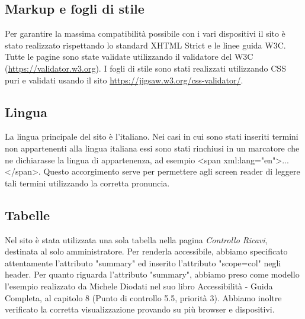 \subsection{Markup e fogli di stile}
Per garantire la massima compatibilità possibile con i vari dispositivi il sito è stato realizzato rispettando lo standard XHTML Strict e le linee guida W3C. Tutte le pagine sono state validate utilizzando il validatore del W3C (\url{https://validator.w3.org}). \newline
I fogli di stile sono stati realizzati utilizzando CSS puri e validati usando il sito \url{https://jigsaw.w3.org/css-validator/}.

\subsection{Lingua}
La lingua principale del sito è l'italiano. Nei casi in cui sono stati inseriti termini non appartenenti alla lingua italiana essi sono stati rinchiusi in un marcatore che ne dichiarasse la lingua di appartenenza, ad esempio <span xml:lang="en">...</span>. Questo accorgimento serve per permettere agli screen reader di leggere tali termini utilizzando la corretta pronuncia.

\subsection{Tabelle}
Nel sito è stata utilizzata una sola tabella nella pagina \textit{Controllo Ricavi}, destinata al solo amministratore. Per renderla accessibile, abbiamo specificato attentamente l’attributo "summary" ed inserito l’attributo "scope=col" negli header. \newline
Per quanto riguarda l'attributo "summary", abbiamo preso come modello l'esempio realizzato da Michele Diodati nel suo libro Accessibilità - Guida Completa, al capitolo 8 (Punto di controllo 5.5, priorità 3). \newline
Abbiamo inoltre verificato la corretta visualizzazione provando su più browser e dispositivi.


